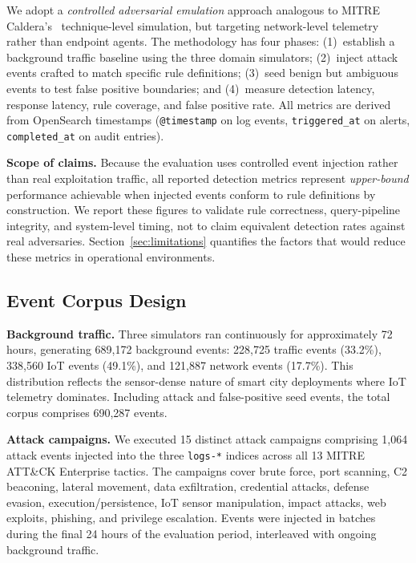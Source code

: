 \documentclass[conference,10pt]{IEEEtran}
\begin{document}
We adopt a \emph{controlled adversarial emulation} approach analogous to MITRE Caldera's~\cite{caldera2016} technique-level simulation, but targeting network-level telemetry rather than endpoint agents. The methodology has four phases: (1)~establish a background traffic baseline using the three domain simulators; (2)~inject attack events crafted to match specific rule definitions; (3)~seed benign but ambiguous events to test false positive boundaries; and (4)~measure detection latency, response latency, rule coverage, and false positive rate. All metrics are derived from OpenSearch timestamps (\texttt{@timestamp} on log events, \texttt{triggered\_at} on alerts, \texttt{completed\_at} on audit entries).

\textbf{Scope of claims.} Because the evaluation uses controlled event injection rather than real exploitation traffic, all reported detection metrics represent \emph{upper-bound} performance achievable when injected events conform to rule definitions by construction. We report these figures to validate rule correctness, query-pipeline integrity, and system-level timing, not to claim equivalent detection rates against real adversaries. Section~\ref{sec:limitations} quantifies the factors that would reduce these metrics in operational environments.

\subsection{Event Corpus Design}

\textbf{Background traffic.} Three simulators ran continuously for approximately 72 hours, generating 689,172 background events: 228,725 traffic events (33.2\%), 338,560 IoT events (49.1\%), and 121,887 network events (17.7\%). This distribution reflects the sensor-dense nature of smart city deployments where IoT telemetry dominates. Including attack and false-positive seed events, the total corpus comprises 690,287 events.

\textbf{Attack campaigns.} We executed 15 distinct attack campaigns comprising 1,064 attack events injected into the three \texttt{logs-*} indices across all 13 MITRE ATT\&CK Enterprise tactics. The campaigns cover brute force, port scanning, C2 beaconing, lateral movement, data exfiltration, credential attacks, defense evasion, execution/persistence, IoT sensor manipulation, impact attacks, web exploits, phishing, and privilege escalation. Events were injected in batches during the final 24 hours of the evaluation period, interleaved with ongoing background traffic.
\end{document}
